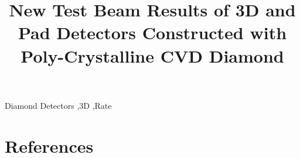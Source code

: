 \documentclass[final,5p,times,twocolumn]{elsarticle}
\title{New Test Beam Results of 3D and Pad Detectors Constructed with Poly-Crystalline CVD Diamond}
\begin{document}
\begin{frontmatter}

	
	
	
	\begin{keyword}
	Diamond Detectors \sep 3D \sep Rate
	\end{keyword}

\end{frontmatter}

\linenumbers








\section*{References}

\end{document}

